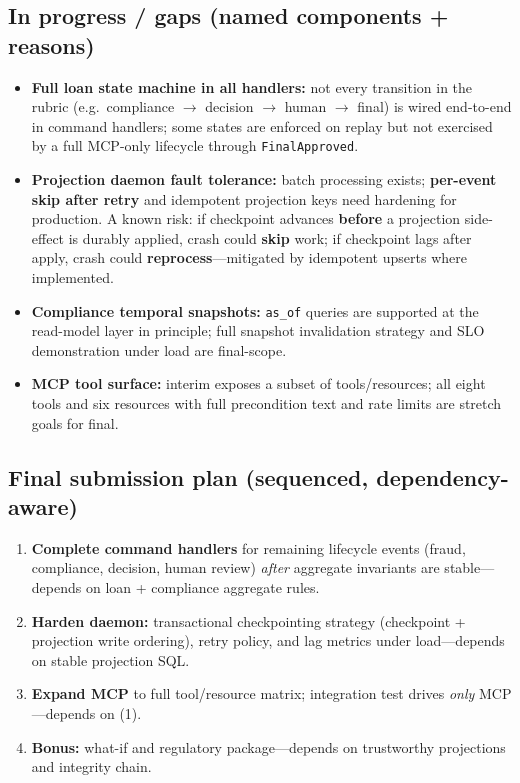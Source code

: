 \documentclass[11pt,a4paper]{article}
\begin{document}
\subsection{In progress / gaps (named components + reasons)}

\begin{itemize}[leftmargin=*]
  \item \textbf{Full loan state machine in all handlers:} not every transition in the rubric (e.g.\ compliance $\rightarrow$ decision $\rightarrow$ human $\rightarrow$ final) is wired end-to-end in command handlers; some states are enforced on replay but not exercised by a full MCP-only lifecycle through \texttt{FinalApproved}.
  \item \textbf{Projection daemon fault tolerance:} batch processing exists; \textbf{per-event skip after retry} and idempotent projection keys need hardening for production. A known risk: if checkpoint advances \textbf{before} a projection side-effect is durably applied, crash could \textbf{skip} work; if checkpoint lags after apply, crash could \textbf{reprocess}---mitigated by idempotent upserts where implemented.
  \item \textbf{Compliance temporal snapshots:} \texttt{as\_of} queries are supported at the read-model layer in principle; full snapshot invalidation strategy and SLO demonstration under load are final-scope.
  \item \textbf{MCP tool surface:} interim exposes a subset of tools/resources; all eight tools and six resources with full precondition text and rate limits are stretch goals for final.
\end{itemize}

\subsection{Final submission plan (sequenced, dependency-aware)}

\begin{enumerate}[leftmargin=*]
  \item \textbf{Complete command handlers} for remaining lifecycle events (fraud, compliance, decision, human review) \emph{after} aggregate invariants are stable---depends on loan + compliance aggregate rules.
  \item \textbf{Harden daemon:} transactional checkpointing strategy (checkpoint + projection write ordering), retry policy, and lag metrics under load---depends on stable projection SQL.
  \item \textbf{Expand MCP} to full tool/resource matrix; integration test drives \emph{only} MCP---depends on (1).
  \item \textbf{Bonus:} what-if and regulatory package---depends on trustworthy projections and integrity chain.
\end{enumerate}
\end{document}
